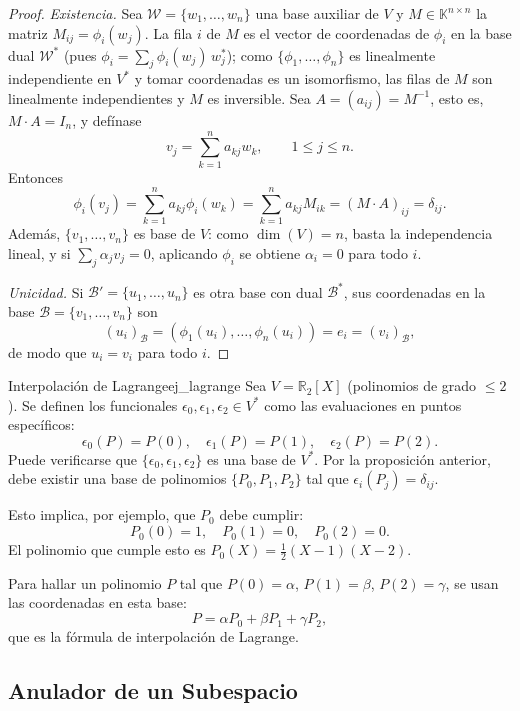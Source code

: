 \documentclass[11pt, a4paper]{article}
\begin{document}
\begin{proof}
\textit{Existencia.} Sea $\mathcal{W} = \{w_1, \dots, w_n\}$ una base auxiliar de $V$ y $M \in \mathbb{K}^{n \times n}$ la matriz $M_{ij} = \phi_i(w_j)$. La fila $i$ de $M$ es el vector de coordenadas de $\phi_i$ en la base dual $\mathcal{W}^*$ (pues $\phi_i = \sum_j \phi_i(w_j)\, w_j^*$); como $\{\phi_1, \dots, \phi_n\}$ es linealmente independiente en $V^*$ y tomar coordenadas es un isomorfismo, las filas de $M$ son linealmente independientes y $M$ es inversible. Sea $A = (a_{ij}) = M^{-1}$, esto es, $M \cdot A = I_n$, y defínase
\[
v_j = \sum_{k=1}^n a_{kj} w_k, \qquad 1 \le j \le n.
\]
Entonces
\[
\phi_i(v_j) = \sum_{k=1}^n a_{kj} \phi_i(w_k) = \sum_{k=1}^n a_{kj} M_{ik} = (M \cdot A)_{ij} = \delta_{ij}.
\]
Además, $\{v_1, \dots, v_n\}$ es base de $V$: como $\dim(V) = n$, basta la independencia lineal, y si $\sum_j \alpha_j v_j = 0$, aplicando $\phi_i$ se obtiene $\alpha_i = 0$ para todo $i$.

\textit{Unicidad.} Si $\mathcal{B}' = \{u_1, \dots, u_n\}$ es otra base con dual $\mathcal{B}^*$, sus coordenadas en la base $\mathcal{B} = \{v_1, \dots, v_n\}$ son
\[
(u_i)_{\mathcal{B}} = (\phi_1(u_i), \dots, \phi_n(u_i)) = e_i = (v_i)_{\mathcal{B}},
\]
de modo que $u_i = v_i$ para todo $i$.
\end{proof}

\begin{ejemplo}{Interpolación de Lagrange}{ej_lagrange}
Sea $V = \mathbb{R}_2[X]$ (polinomios de grado $\le 2$). Se definen los funcionales $\epsilon_0, \epsilon_1, \epsilon_2 \in V^*$ como las evaluaciones en puntos específicos:
\[
\epsilon_0(P) = P(0), \quad \epsilon_1(P) = P(1), \quad \epsilon_2(P) = P(2).
\]
Puede verificarse que $\{\epsilon_0, \epsilon_1, \epsilon_2\}$ es una base de $V^*$. Por la proposición anterior, debe existir una base de polinomios $\{P_0, P_1, P_2\}$ tal que $\epsilon_i(P_j) = \delta_{ij}$.

Esto implica, por ejemplo, que $P_0$ debe cumplir:
\[
P_0(0)=1, \quad P_0(1)=0, \quad P_0(2)=0.
\]
El polinomio que cumple esto es $P_0(X) = \frac{1}{2}(X-1)(X-2)$.

Para hallar un polinomio $P$ tal que $P(0)=\alpha$, $P(1)=\beta$, $P(2)=\gamma$, se usan las coordenadas en esta base:
\[
P = \alpha P_0 + \beta P_1 + \gamma P_2,
\]
que es la fórmula de interpolación de Lagrange.
\end{ejemplo}

\subsection{Anulador de un Subespacio}
\end{document}
